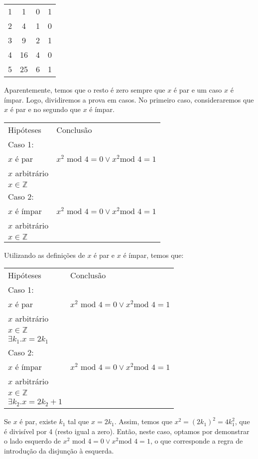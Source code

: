 \begin{Example}
\begin{table}
\begin{tabular}{cccc}
\hline
1 & 1 & 0 & 1 \\
2 & 4 & 1 & 0 \\
3 & 9 & 2 & 1 \\
4 & 16 & 4 & 0 \\
5 & 25 & 6 & 1 \\
\end{tabular}
\centering
\end{table}
Aparentemente, temos que o resto é zero sempre que $x$ é par e um caso
$x$ é ímpar. Logo, dividiremos a prova em casos. No primeiro caso,
consideraremos que $x$ é par e no segundo que $x$ é ímpar.
\begin{flushleft}
\begin{tabular}{ll}
Hipóteses & Conclusão \\
Caso 1: & \\
$x$ é par & $x^2 \text{ mod } 4 = 0 \lor x^2 \text{
  mod } 4 = 1$\\
 $x$ arbitrário & \\
$x\in\mathbb{Z}$ & \\
Caso 2: & \\
$x$ é ímpar & $x^2 \text{ mod } 4 = 0 \lor x^2 \text{
  mod } 4 = 1$\\
 $x$ arbitrário & \\
$x\in\mathbb{Z}$ & \\
\end{tabular}
\end{flushleft}
Utilizando as definições de $x$ é par e $x$ é ímpar, temos que:
\begin{flushleft}
\begin{tabular}{ll}
Hipóteses & Conclusão \\
Caso 1: & \\
$x$ é par & $x^2 \text{ mod } 4 = 0 \lor x^2 \text{
  mod } 4 = 1$\\
 $x$ arbitrário & \\
$x\in\mathbb{Z}$ & \\
$\exists k_1. x= 2k_1$ & \\
Caso 2: & \\
$x$ é ímpar & $x^2 \text{ mod } 4 = 0 \lor x^2 \text{
  mod } 4 = 1$\\
 $x$ arbitrário & \\
$x\in\mathbb{Z}$ & \\
$\exists k_2. x= 2k_2 + 1$ & \\
\end{tabular}
\end{flushleft}
Se $x$ é par, existe $k_1$ tal que $x = 2k_1$. Assim, temos que $x^2 =
(2k_1)^2 = 4k_1^2$, que é divisível por 4 (resto igual a zero). Então,
neste caso, optamos por demonstrar o lado esquerdo de $x^2 \text{ mod } 4 = 0 \lor x^2 \text{
  mod } 4 = 1$, o que corresponde a regra de introdução da disjunção à
esquerda.


\end{Example}
